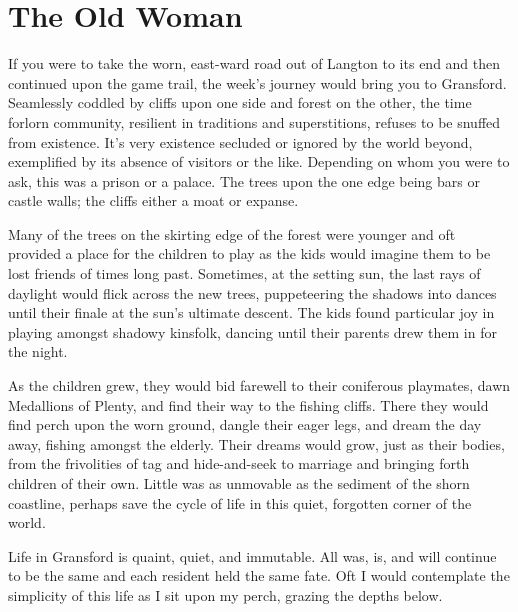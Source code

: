 \chapter*{The Old Woman}


If you were to take the worn, east-ward road out of Langton to its end and then continued upon the game trail, the week's journey would bring you to Gransford. Seamlessly coddled by cliffs upon one side and forest on the other, the time forlorn community, resilient in traditions and superstitions, refuses to be snuffed from existence. It's very existence secluded or ignored by the world beyond, exemplified by its absence of visitors or the like. Depending on whom you were to ask, this was a prison or a palace. The trees upon the one edge being bars or castle walls; the cliffs either a moat or expanse.

Many of the trees on the skirting edge of the forest were younger and oft provided a place for the children to play as the kids would imagine them to be lost friends of times long past. Sometimes, at the setting sun, the last rays of daylight would flick across the new trees, puppeteering the shadows into dances until their finale at the sun's ultimate descent. The kids found particular joy in playing amongst shadowy kinsfolk, dancing until their parents drew them in for the night.

As the children grew, they would bid farewell to their coniferous playmates, dawn Medallions of Plenty, and find their way to the fishing cliffs. There they would find perch upon the worn ground, dangle their eager legs, and dream the day away, fishing amongst the elderly. Their dreams would grow, just as their bodies, from the frivolities of tag and hide-and-seek to marriage and bringing forth children of their own. Little was as unmovable as the sediment of the shorn coastline, perhaps save the cycle of life in this quiet, forgotten corner of the world.

Life in Gransford is quaint, quiet, and immutable. All was, is, and will continue to be the same and each resident held the same fate. Oft I would contemplate the simplicity of this life as I sit upon my perch, grazing the depths below.
